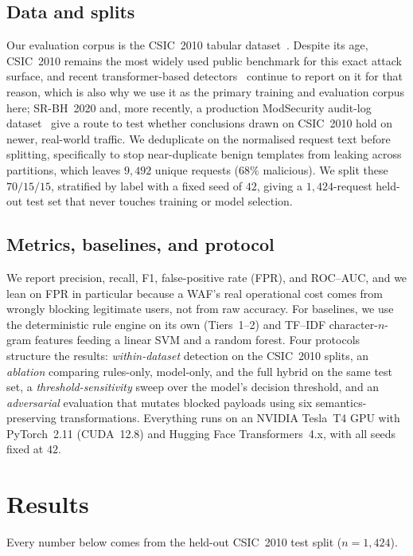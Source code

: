 \documentclass[conference]{IEEEtran}
\begin{document}
\subsection{Data and splits}
Our evaluation corpus is the CSIC~2010 tabular dataset~\cite{gimenez2010csic}.
Despite its age, CSIC~2010 remains the most widely used public benchmark
for this exact attack surface, and recent transformer-based
detectors~\cite{wadbert2026,liu2024bertlstm,scireports2024novelxsssqli}
continue to report on it for that reason, which is also why we use it as
the primary training and evaluation corpus here; SR-BH~2020 and, more
recently, a production ModSecurity audit-log
dataset~\cite{modsec30day2025} give a route to test whether conclusions
drawn on CSIC~2010 hold on newer, real-world traffic. We deduplicate on
the normalised request text before splitting,
specifically to stop near-duplicate benign templates from leaking across
partitions, which leaves $9{,}492$ unique requests ($68\%$ malicious). We
split these $70/15/15$, stratified by label with a fixed seed of $42$,
giving a $1{,}424$-request held-out test set that never touches training
or model selection.

\subsection{Metrics, baselines, and protocol}
We report precision, recall, F1, false-positive rate (FPR), and
ROC--AUC, and we lean on FPR in particular because a WAF's real
operational cost comes from wrongly blocking legitimate users, not from
raw accuracy. For baselines, we use the deterministic rule engine on its
own (Tiers~1--2) and TF--IDF character-$n$-gram features feeding a
linear SVM and a random forest. Four protocols structure the results:
\emph{within-dataset} detection on the CSIC~2010 splits, an
\emph{ablation} comparing rules-only, model-only, and the full hybrid on
the same test set, a \emph{threshold-sensitivity} sweep over the model's
decision threshold, and an \emph{adversarial} evaluation that mutates
blocked payloads using six semantics-preserving transformations.
Everything runs on an NVIDIA Tesla~T4 GPU with PyTorch~2.11 (CUDA~12.8)
and Hugging Face Transformers~4.x, with all seeds fixed at $42$.

\section{Results}
Every number below comes from the held-out CSIC~2010 test split
($n=1{,}424$).
\end{document}
